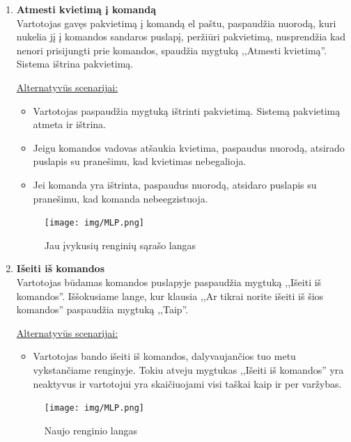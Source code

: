 \documentclass{VUMIFPSkursinis}
\begin{document}
\begin{enumerate} [label = \textbf{U\arabic*.}]
				\begin{figure}[H]
					\centering
					\texttt{[image: img/MLP.png]}
					\caption{Atsiliepimo apie renginį langas}
					\label{fig:rasyti-atsiliepima-apie-rengini}
				\end{figure}

			\item \textbf{Atmesti kvietimą į komandą} \\
				Vartotojas gavęs pakvietimą į komandą el paštu, paspaudžia nuorodą, kuri nukelia jį į komandos sandaros puslapį, peržiūri pakvietimą, nusprendžia kad nenori prisijungti prie komandos, spaudžia mygtuką ,,Atmesti kvietimą''. Sistema ištrina pakvietimą.


				\underline{Alternatyvūs scenarijai:}
				\begin{itemize}
					\item Vartotojas paspaudžia mygtuką ištrinti pakvietimą. Sistemą pakvietimą atmeta ir ištrina.
					\item Jeigu komandos vadovas atšaukia kvietima, paspaudus nuorodą, atsirado puslapis su pranešimu, kad kvietimas nebegalioja.
					\item Jei komanda yra ištrinta, paspaudus nuorodą, atsidaro puslapis su pranešimu, kad komanda nebeegzistuoja.
				\end{itemize}

				\begin{figure}[H]
					\centering
					\texttt{[image: img/MLP.png]}
					\caption{Jau įvykusių renginių sąrašo langas}
					\label{fig:matyti-jau-ivykusius-renginius}
				\end{figure}
			
			\item \textbf{Išeiti iš komandos} \\
				Vartotojas būdamas komandos puslapyje paspaudžia mygtuką ,,Išeiti iš komandos''. Iššokusiame lange, kur klausia ,,Ar tikrai norite išeiti iš šios komandos'' paspaudžia mygtuką ,,Taip''.
				
				\underline{Alternatyvūs scenarijai:}
				\begin{itemize}
					\item Vartotojas bando išeiti iš komandos, dalyvaujančios tuo metu vykstančiame renginyje. Tokiu atveju mygtukas  ,,Išeiti iš komandos'' yra neaktyvus ir vartotojui yra skaičiuojami visi taškai kaip ir per varžybas.
				\end{itemize}
				
				\begin{figure}[H]
					\centering
					\texttt{[image: img/MLP.png]}
					\caption{Naujo renginio langas}
					\label{fig:paskelbti-nauja-rengini}
				\end{figure}


\end{enumerate}
\end{document}
